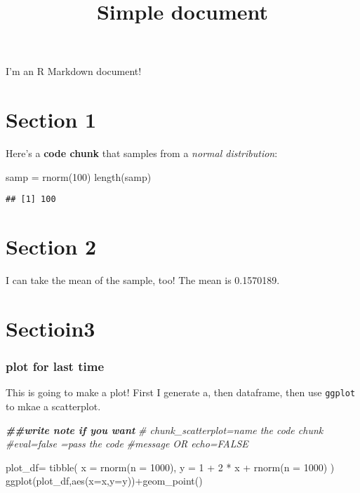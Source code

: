 \documentclass[
]{article}
\title{Simple document}
\author{}
\date{\vspace{-2.5em}}
\newenvironment{Shaded}{\begin{snugshade}}{\end{snugshade}}
\newcommand{\AttributeTok}[1]{\textcolor[rgb]{0.77,0.63,0.00}{#1}}
\newcommand{\CommentTok}[1]{\textcolor[rgb]{0.56,0.35,0.01}{\textit{#1}}}
\newcommand{\DecValTok}[1]{\textcolor[rgb]{0.00,0.00,0.81}{#1}}
\newcommand{\DocumentationTok}[1]{\textcolor[rgb]{0.56,0.35,0.01}{\textbf{\textit{#1}}}}
\newcommand{\FunctionTok}[1]{\textcolor[rgb]{0.00,0.00,0.00}{#1}}
\newcommand{\NormalTok}[1]{#1}
\newcommand{\OtherTok}[1]{\textcolor[rgb]{0.56,0.35,0.01}{#1}}
\newcommand{\SpecialCharTok}[1]{\textcolor[rgb]{0.00,0.00,0.00}{#1}}
\begin{document}
\maketitle

I'm an R Markdown document!

\hypertarget{section-1}{%
\section{Section 1}\label{section-1}}

Here's a \textbf{code chunk} that samples from a \emph{normal
distribution}:

\begin{Shaded}
\begin{Highlighting}[]
\NormalTok{samp }\OtherTok{=} \FunctionTok{rnorm}\NormalTok{(}\DecValTok{100}\NormalTok{)}
\FunctionTok{length}\NormalTok{(samp)}
\end{Highlighting}
\end{Shaded}

\begin{verbatim}
## [1] 100
\end{verbatim}

\hypertarget{section-2}{%
\section{Section 2}\label{section-2}}

I can take the mean of the sample, too! The mean is 0.1570189.

\hypertarget{sectioin3}{%
\section{Sectioin3}\label{sectioin3}}

\hypertarget{plot-for-last-time}{%
\subsubsection{plot for last time}\label{plot-for-last-time}}

This is going to make a plot! First I generate a, then dataframe, then
use \texttt{ggplot} to mkae a scatterplot.

\begin{Shaded}
\begin{Highlighting}[]
\DocumentationTok{\#\#write note if you want}
\CommentTok{\# chunk\_scatterplot=name the code chunk}
\CommentTok{\#eval=false =pass the code}
\CommentTok{\#message OR echo=FALSE}

\NormalTok{plot\_df}\OtherTok{=}
  \FunctionTok{tibble}\NormalTok{(}
    \AttributeTok{x =} \FunctionTok{rnorm}\NormalTok{(}\AttributeTok{n =} \DecValTok{1000}\NormalTok{),}
    \AttributeTok{y =} \DecValTok{1} \SpecialCharTok{+} \DecValTok{2} \SpecialCharTok{*}\NormalTok{ x }\SpecialCharTok{+} \FunctionTok{rnorm}\NormalTok{(}\AttributeTok{n =} \DecValTok{1000}\NormalTok{)}
\NormalTok{  )}
\FunctionTok{ggplot}\NormalTok{(plot\_df,}\FunctionTok{aes}\NormalTok{(}\AttributeTok{x=}\NormalTok{x,}\AttributeTok{y=}\NormalTok{y))}\SpecialCharTok{+}\FunctionTok{geom\_point}\NormalTok{()}
\end{Highlighting}
\end{Shaded}
\end{document}
